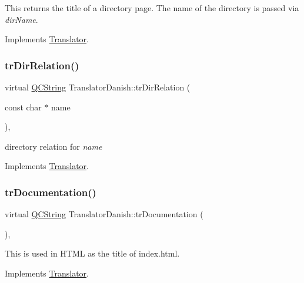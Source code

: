 This returns the title of a directory page. The name of the directory is passed via {\itshape dir\+Name}. 

Implements \mbox{\hyperlink{class_translator}{Translator}}.

\mbox{\label{class_translator_danish_af1ed1ccdc6ae2f20e8134db08d7c051e}} 
\subsubsection{\texorpdfstring{trDirRelation()}{trDirRelation()}}
{\footnotesize\ttfamily virtual \mbox{\hyperlink{class_q_c_string}{Q\+C\+String}} Translator\+Danish\+::tr\+Dir\+Relation (\begin{DoxyParamCaption}\item[{const char $\ast$}]{name }\end{DoxyParamCaption})\hspace{0.3cm}{\ttfamily [inline]}, {\ttfamily [virtual]}}

directory relation for {\itshape name} 

Implements \mbox{\hyperlink{class_translator}{Translator}}.

\mbox{\label{class_translator_danish_abf5c7558e37d696661ed17439a1ce967}} 
\subsubsection{\texorpdfstring{trDocumentation()}{trDocumentation()}}
{\footnotesize\ttfamily virtual \mbox{\hyperlink{class_q_c_string}{Q\+C\+String}} Translator\+Danish\+::tr\+Documentation (\begin{DoxyParamCaption}{ }\end{DoxyParamCaption})\hspace{0.3cm}{\ttfamily [inline]}, {\ttfamily [virtual]}}

This is used in H\+T\+ML as the title of index.\+html. 

Implements \mbox{\hyperlink{class_translator}{Translator}}.

\mbox{\label{class_translator_danish_a07884d28639a160b023a067984cbe901}} 
